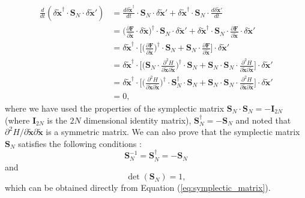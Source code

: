 \begin{align}
\frac{d}{dt}(\delta \tilde{\bm{x}}^{\dagger}\cdot \bm{S}_N\cdot \delta \tilde{\bm{x}}')
&= \frac{d\delta \tilde{\bm{x}}^{\dagger}}{dt}\cdot \bm{S}_N\cdot \delta \tilde{\bm{x}}'+\delta \tilde{\bm{x}}^{\dagger}\cdot \bm{S}_N\cdot \frac{d\delta \tilde{\bm{x}}'}{dt}
\nonumber \\
&= \bigg(\frac{\partial \bm{F}}{\partial \tilde{\bm{x}}}\cdot \delta \tilde{\bm{x}}\bigg)^{\dagger}\cdot \bm{S}_N\cdot \delta \tilde{\bm{x}}'+\delta \tilde{\bm{x}}^{\dagger}\cdot \bm{S}_N \cdot \frac{\partial \bm{F}}{\partial \tilde{\bm{x}}}\cdot \delta \tilde{\bm{x}}'
 \nonumber \\
&= \delta \tilde{\bm{x}}^{\dagger}\cdot \Bigg[\bigg(\frac{\partial \bm{F}}{\partial \tilde{\bm{x}}}\bigg)^{\dagger}\cdot\bm{S}_N+\bm{S}_N\cdot \frac{\partial \bm{F}}{\partial \tilde{\bm{x}}}\Bigg]\cdot \delta\tilde{\bm{x}}'
\nonumber \\
&= \delta\tilde{\bm{x}}^{\dagger}\cdot\Bigg[\bigg(\bm{S}_N\cdot\frac{\partial^2 H}{\partial \tilde{\bm{x}} \partial \tilde{\bm{x}}}\bigg)^{\dagger}\cdot \bm{S}_N+\bm{S}_N\cdot\bm{S}_N\cdot\frac{\partial^2 H}{\partial\tilde{\bm{x}}\partial\tilde{\bm{x}}}\Bigg]\cdot\delta\tilde{\bm{x}}' \nonumber \\
&= \delta\tilde{\bm{x}}^{\dagger}\cdot\Bigg[\bigg(\frac{\partial^2 H}{\partial \tilde{\bm{x}} \partial \tilde{\bm{x}}}\bigg)^{\dagger}\cdot\bm{S}_N^{\dagger}\cdot \bm{S}_N+\bm{S}_N\cdot\bm{S}_N\cdot\frac{\partial^2 H}{\partial\tilde{\bm{x}}\partial\tilde{\bm{x}}}\Bigg]\cdot\delta\tilde{\bm{x}}' \nonumber \\
&=0,
\label{eq:proff_sympl_area}
\end{align} 
where we have used the properties of the symplectic matrix $\bm{S}_N\cdot\bm{S}_N=-\bm{I}_{2N}$ (where $\bm{I}_{2N}$ is the $2N$ dimensional identity matrix), $\bm{S}_N^{\dagger}=-\bm{S}_N$ and noted that $\partial^2H/\partial\tilde{\bm{x}}\partial\tilde{\bm{x}}$ is a symmetric matrix. We can also prove that the symplectic matrix $\bm{S}_N$ satisfies the following conditions \cite{arnold1968probemes} :
\begin{equation}
\bm{S}_N^{-1}=\bm{S}_N^{\dagger}=-\bm{S}_N
\end{equation}
and
\begin{equation}
\det(\bm{S}_N)=1,
\end{equation}
which can be obtained directly from Equation (\ref{eq:symplectic_matrix}).\par

